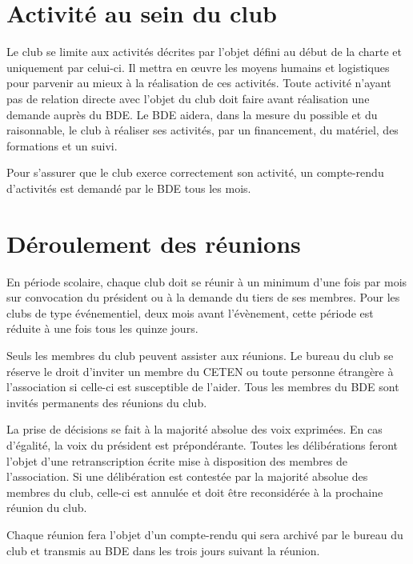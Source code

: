 \documentclass{article} %
\begin{document}
\begin{multicols}{2}
{		}

		\section{Activité au sein du club}
		
		{\small
		
			Le club se limite aux activités décrites par l’objet défini au début
			de la charte et uniquement par celui-ci. Il mettra en œuvre les
			moyens humains et logistiques pour parvenir au mieux à la
			réalisation de ces activités. Toute activité n’ayant pas de relation
			directe avec l’objet du club doit faire avant réalisation une
			demande auprès du BDE. Le BDE aidera, dans la mesure du possible et
			du raisonnable, le club à réaliser ses activités, par un 
			financement, du matériel, des formations et un suivi.

			Pour s’assurer que le club exerce correctement son activité, un
			compte-rendu d’activités est demandé par le BDE tous les mois.
			
		}

		\section{Déroulement des réunions}
		
		{\small
		
			En période scolaire, chaque club doit se réunir à un minimum d’une
			fois par mois sur convocation du président ou à la demande du tiers
			de ses membres. Pour les clubs de type événementiel, deux mois avant
			l’évènement, cette période est réduite à une fois tous les quinze
			jours.  

			Seuls les membres du club peuvent assister aux réunions. Le bureau
			du club se réserve le droit d’inviter un membre du CETEN ou toute
			personne étrangère à l’association si celle-ci est susceptible de
			l’aider. Tous les membres du BDE sont invités permanents des
			réunions du club.

			La prise de décisions se fait à la majorité absolue des voix
			exprimées. En cas d’égalité, la voix du président est prépondérante.
			Toutes les délibérations feront l’objet d’une retranscription écrite
			mise à disposition des membres de l’association. Si une délibération
			est contestée par la majorité absolue des membres du club, celle-ci
			est annulée et doit être reconsidérée à la prochaine réunion du
			club.

			Chaque réunion fera l’objet d’un compte-rendu qui sera archivé par
			le bureau du club et transmis au BDE dans les trois jours suivant la
			réunion.
			
}
\end{multicols}
\end{document}
